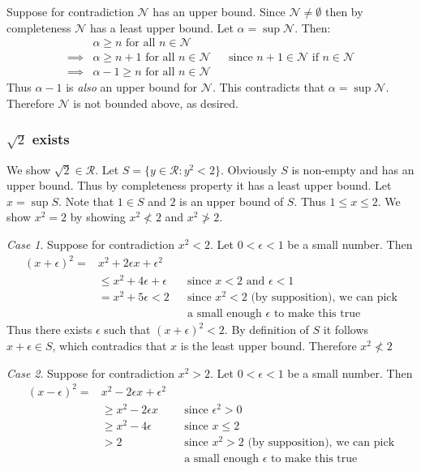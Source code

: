 \vs

Suppose for contradiction $\mathcal{N}$ has an upper bound. Since $\mathcal{N}\neq\emptyset$ then by
completeness $\mathcal{N}$ has a least upper bound. Let $\alpha=\sup \mathcal{N}$. Then:
\begin{align*}
  &\alpha\geq n \text{ for all } n\in\mathcal{N}\\
  \implies &\alpha\geq n+1 \text{ for all } n\in\mathcal{N}&&\text{since $n+1\in\mathcal{N}$ if $n\in\mathcal{N}$}\\
  \implies &\alpha-1\geq n \text{ for all } n\in\mathcal{N}
\end{align*}
Thus $\alpha-1$ is \textit{also} an upper bound for $\mathcal{N}$. This contradicts
that $\alpha=\sup \mathcal{N}$. Therefore $\mathcal{N}$ is not bounded above, as desired.

\vs

\subsubsection*{$\sqrt{2}$ exists}

We show $\sqrt{2}\in\mathcal{R}$. Let
$S=\{y\in\mathcal{R} : y^{2}<2\}$. Obviously $S$ is non-empty and has an upper
bound. Thus by completeness property it has a least upper bound. Let
$x=\sup S$. Note that $1\in S$ and $2$ is an upper bound of $S$. Thus
$1\leq x\leq2$. We show $x^{2}=2$ by showing $x^{2}\not<2$ and
$x^{2}\not>2$.

\vs

\textit{Case 1}. Suppose for contradiction $x^{2}<2$. Let $0<\epsilon<1$ be a
small number. Then
\begin{align*}
  {(x+\epsilon)}^{2}=&x^{2}+2\epsilon x+\epsilon^{2}\\
              &\leq x^{2}+4\epsilon+\epsilon&&\text{since $x<2$ and $\epsilon<1$}\\
              &=x^{2}+5\epsilon<2&&\text{since $x^{2}<2$ (by supposition), we
                             can pick}\\
              &&&\text{a small enough $\epsilon$ to make this true}
\end{align*}
Thus there exists $\epsilon$ such that ${(x+\epsilon)}^{2}<2$. By definition of
$S$ it follows $x+\epsilon\in S$, which contradics that $x$ is the least upper
bound. Therefore $x^{2}\not<2$

\vs

\textit{Case 2}. Suppose for contradiction $x^{2}>2$. Let $0<\epsilon<1$ be a
small number. Then
\begin{align*}
  {(x-\epsilon)}^{2}=&x^{2}-2\epsilon x+\epsilon^{2}\\
              &\geq x^{2}-2\epsilon x&&\text{since $\epsilon^{2}>0$}\\
              &\geq x^{2}-4\epsilon&&\text{since $x\leq2$}\\
              &>2&&\text{since $x^{2}>2$ (by supposition), we
                             can pick}\\
              &&&\text{a small enough $\epsilon$ to make this true}
\end{align*}

